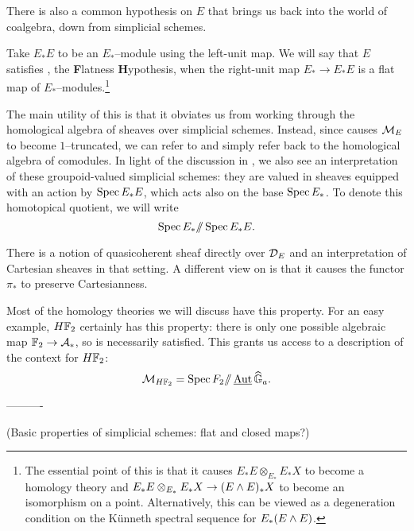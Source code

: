 There is also a common hypothesis on $E$ that brings us back into the world of coalgebra, down from simplicial schemes.
\begin{definition}
Take $E_* E$ to be an $E_*$--module using the left-unit map.  We will say that $E$ satisfies \FH, the \textbf Flatness \textbf Hypothesis, when the right-unit map $E_* \to E_* E$ is a flat map of $E_*$--modules.\footnote{The essential point of this is that it causes $E_* E \otimes_{E_*} E_* X$ to become a homology theory and $E_* E \otimes_{E_*} E_* X \to (E \wedge E)_* X$ to become an isomorphism on a point.  Alternatively, this can be viewed as a degeneration condition on the K\"unneth spectral sequence for $E_* (E \wedge E)$.}
\end{definition}

\begin{remark}
The main utility of this is that it obviates us from working through the homological algebra of sheaves over simplicial schemes.  Instead, since {\FH} causes $\mathcal{M}_{E}$ to become $1$--truncated, we can refer to  and simply refer back to the homological algebra of comodules.  In light of the discussion in , we also see an interpretation of these groupoid-valued simplicial schemes: they are valued in sheaves equipped with an action by $\operatorname{Spec} E_* E$, which acts also on the base $\operatorname{Spec} E_*$.  To denote this homotopical quotient, we will write \[\operatorname{Spec} E_* /\!\!/ \operatorname{Spec} E_* E.\]
\end{remark}

\begin{remark}
There is a notion of quasicoherent sheaf directly over $\mathcal{D}_E$ and an interpretation of Cartesian sheaves in that setting.  A different view on {\FH} is that it causes the functor $\pi_*$ to preserve Cartesianness.
\end{remark}

\begin{example}
Most of the homology theories we will discuss have this property.  For an easy example, $H\mathbb F_2$ certainly has this property: there is only one possible algebraic map $\mathbb F_2 \to \mathcal A_*$, so {\FH} is necessarily satisfied.  This grants us access to a description of the context for $H\mathbb F_2$: \[\mathcal{M}_{H\mathbb F_2} = \operatorname{Spec} F_2 /\!\!/ \operatorname{\underline{\smash{\operatorname{Aut}}}}{\widehat{\mathbb G}_a}.\]
\end{example}


----------


(Basic properties of simplicial schemes: flat and closed maps?)

